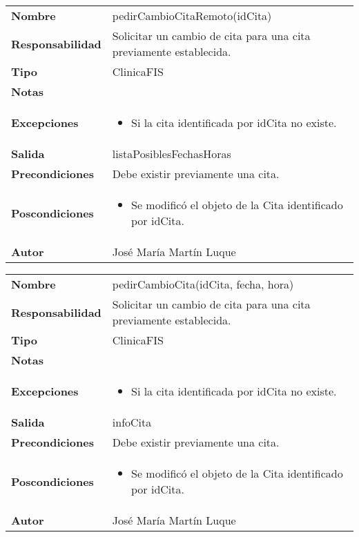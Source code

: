 \documentclass[11pt,a4paper]{article}
\newenvironment{itemizenomargins}
    {\begin{minipage}[t]{1\linewidth}\begin{itemize}}
    {\end{itemize}\end{minipage}}
\begin{document}
\begin{table}[H]
	\centering
	\label{pedir-cambio-cita-remoto}
	\begin{tabularx}{\textwidth}{l|X}
    \textbf{Nombre}          & pedirCambioCitaRemoto(idCita)\\
		\textbf{Responsabilidad} & Solicitar un cambio de cita para una cita previamente establecida. \\
		\textbf{Tipo}            & ClinicaFIS \\
		\textbf{Notas}           &  \\
		\textbf{Excepciones}     & 
		\begin{itemizenomargins}
			\item Si la cita identificada por idCita no existe.
		\end{itemizenomargins} \\
		\textbf{Salida}          &  listaPosiblesFechasHoras\\
		\textbf{Precondiciones}  &  Debe existir previamente una cita.\\
		\textbf{Poscondiciones}  & 
		\begin{itemizenomargins}
			\item Se modificó el objeto de la Cita identificado por idCita.
		\end{itemizenomargins} \\
		\textbf{Autor}			 & José María Martín Luque
	\end{tabularx}
\end{table}

\begin{table}[H]
	\centering
	\label{pedir-cambio-cita}
	\begin{tabularx}{\textwidth}{l|X}
    \textbf{Nombre}          & pedirCambioCita(idCita, fecha, hora)\\
		\textbf{Responsabilidad} & Solicitar un cambio de cita para una cita previamente establecida. \\
		\textbf{Tipo}            & ClinicaFIS \\
		\textbf{Notas}           &  \\
		\textbf{Excepciones}     & 
		\begin{itemizenomargins}
			\item Si la cita identificada por idCita no existe.
		\end{itemizenomargins} \\
		\textbf{Salida}          &  infoCita\\
		\textbf{Precondiciones}  &  Debe existir previamente una cita.\\
		\textbf{Poscondiciones}  & 
		\begin{itemizenomargins}
			\item Se modificó el objeto de la Cita identificado por idCita.
		\end{itemizenomargins} \\
		\textbf{Autor}			 & José María Martín Luque
	\end{tabularx}
\end{table}
\end{document}
